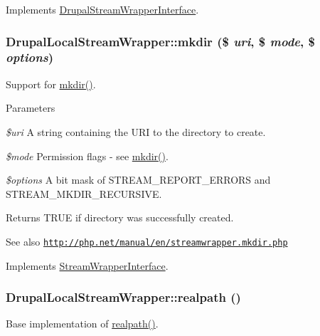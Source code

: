 Implements \hyperlink{interfaceDrupalStreamWrapperInterface_aeedd16f8876b4b3a0cad73a2759db6ca}{DrupalStreamWrapperInterface}.\hypertarget{classDrupalLocalStreamWrapper_a4335af3c075b49182060012ce2b4f735}{
\subsubsection[{mkdir}]{\setlength{\rightskip}{0pt plus 5cm}DrupalLocalStreamWrapper::mkdir (\$ {\em uri}, \/  \$ {\em mode}, \/  \$ {\em options})}}
\label{classDrupalLocalStreamWrapper_a4335af3c075b49182060012ce2b4f735}
Support for \hyperlink{classDrupalLocalStreamWrapper_a4335af3c075b49182060012ce2b4f735}{mkdir()}.


\begin{DoxyParams}{Parameters}
\item[{\em \$uri}]A string containing the URI to the directory to create. \item[{\em \$mode}]Permission flags -\/ see \hyperlink{classDrupalLocalStreamWrapper_a4335af3c075b49182060012ce2b4f735}{mkdir()}. \item[{\em \$options}]A bit mask of STREAM\_\-REPORT\_\-ERRORS and STREAM\_\-MKDIR\_\-RECURSIVE.\end{DoxyParams}
\begin{DoxyReturn}{Returns}
TRUE if directory was successfully created.
\end{DoxyReturn}
\begin{DoxySeeAlso}{See also}
\href{http://php.net/manual/en/streamwrapper.mkdir.php}{\tt http://php.net/manual/en/streamwrapper.mkdir.php} 
\end{DoxySeeAlso}


Implements \hyperlink{interfaceStreamWrapperInterface}{StreamWrapperInterface}.\hypertarget{classDrupalLocalStreamWrapper_a61f0d0ef6a489e3fca2152eb64174237}{
\subsubsection[{realpath}]{\setlength{\rightskip}{0pt plus 5cm}DrupalLocalStreamWrapper::realpath ()}}
\label{classDrupalLocalStreamWrapper_a61f0d0ef6a489e3fca2152eb64174237}
Base implementation of \hyperlink{classDrupalLocalStreamWrapper_a61f0d0ef6a489e3fca2152eb64174237}{realpath()}. 

